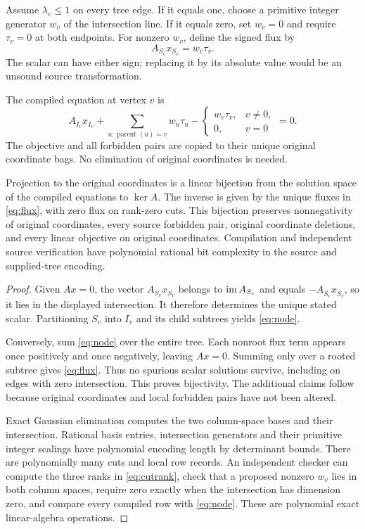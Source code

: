 Assume $\lambda_v\leq1$ on every tree edge. If it equals one, choose a primitive
integer generator $w_v$ of the intersection line. If it equals zero, set
$w_v=0$ and require $\tau_v=0$ at both endpoints. For nonzero $w_v$, define the
signed flux by
\begin{equation}\label{eq:flux}
 A_{S_v}x_{S_v}=w_v\tau_v.
\end{equation}
The scalar can have either sign; replacing it by its absolute value would be
an unsound source transformation.

The compiled equation at vertex $v$ is
\begin{equation}\label{eq:node}
 A_{I_v}x_{I_v}+
 \sum_{u:\operatorname{parent}(u)=v}w_u\tau_u
 -\begin{cases}w_v\tau_v,&v\ne0,\\0,&v=0\end{cases}=0.
\end{equation}
The objective and all forbidden pairs are copied to their unique original
coordinate bags. No elimination of original coordinates is needed.

\begin{theorem}
\label{thm:compiler}
Projection to the original coordinates is a linear bijection from the solution
space of the compiled equations to $\ker A$. The inverse is given by the unique
fluxes in \eqref{eq:flux}, with zero flux on rank-zero cuts. This bijection
preserves nonnegativity of original coordinates, every source forbidden pair,
original coordinate deletions, and every linear objective on original
coordinates. Compilation and independent source verification have polynomial
rational bit complexity in the source and supplied-tree encoding.
\end{theorem}

\begin{proof}
Given $Ax=0$, the vector $A_{S_v}x_{S_v}$ belongs to $\operatorname{im} A_{S_v}$ and equals
$-A_{\overline{S_v}}x_{\overline{S_v}}$, so it lies in the displayed intersection.
It therefore determines the unique stated scalar. Partitioning $S_v$ into
$I_v$ and its child subtrees yields \eqref{eq:node}.

Conversely, sum \eqref{eq:node} over the entire tree. Each nonroot flux term
appears once positively and once negatively, leaving $Ax=0$. Summing only over
a rooted subtree gives \eqref{eq:flux}. Thus no spurious scalar solutions
survive, including on edges with zero intersection. This proves bijectivity.
The additional claims follow because original coordinates and local forbidden
pairs have not been altered.

Exact Gaussian elimination computes the two column-space bases and their
intersection. Rational basis entries, intersection generators and their
primitive integer scalings have polynomial encoding length by determinant
bounds. There are polynomially many cuts and local row records. An independent
checker can compute the three ranks in \eqref{eq:cutrank}, check that a proposed
nonzero $w_v$ lies in both column spaces, require zero exactly when the
intersection has dimension zero, and compare every compiled row with
\eqref{eq:node}. These are polynomial exact linear-algebra operations.
\end{proof}

